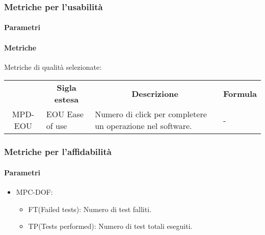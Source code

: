 \subsubsection{Metriche per l'usabilità }

\paragraph{Parametri}
\paragraph{Metriche}
Metriche di qualità selezionate:
\begin{table}[H]
    \centering
    \renewcommand{\arraystretch}{1.8}
    \begin{tabular}{| c | p{4.2cm} | p{5cm} | p{2cm} | }
        \rowcolor[HTML]{a52a2a}
        \multicolumn{1}{c}{\color[HTML]{FFFFFF} \textbf{Codice}}       &
        \multicolumn{1}{c}{\color[HTML]{FFFFFF} \textbf{Sigla estesa}} &
        \multicolumn{1}{c}{\color[HTML]{FFFFFF} \textbf{Descrizione}}  &
        \multicolumn{1}{c}{\color[HTML]{FFFFFF} \textbf{Formula}}                                                                                         \\
        MPD-EOU                                                        & EOU Ease of use & Numero di click per completere un operazione nel software. & - \\
        \hline
    \end{tabular}
\end{table}
\subsubsection{Metriche per l'affidabilità }
\paragraph{Parametri}
\begin{itemize}
    \item MPC-DOF:
          \begin{itemize}
              \item FT(Failed tests):  Numero di test falliti.
              \item TP(Tests performed):  Numero di test totali eseguiti.
          \end{itemize}
\end{itemize}
